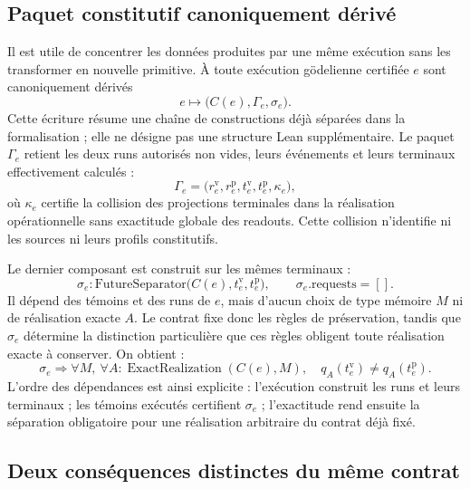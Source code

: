 \documentclass[11pt,a4paper]{article}
\newcommand{\ExactRealization}{\operatorname{ExactRealization}}
\theoremstyle{remark}
\begin{document}
\subsection{Paquet constitutif canoniquement dérivé}

Il est utile de concentrer les données produites par une même exécution
sans les transformer en nouvelle primitive. À toute exécution gödelienne
certifiée $e$ sont canoniquement dérivés
\begin{equation}\label{eq:constitutive-package}
e\longmapsto\bigl(C(e),\Gamma_e,\sigma_e\bigr).
\end{equation}
Cette écriture résume une chaîne de constructions déjà séparées dans la
formalisation ; elle ne désigne pas une structure Lean supplémentaire.
Le paquet $\Gamma_e$ retient les deux runs autorisés non vides, leurs
événements et leurs terminaux effectivement calculés :
\[
\Gamma_e=
\bigl(r_e^{\mathrm v},r_e^{\mathrm p},
      t_e^{\mathrm v},t_e^{\mathrm p},\kappa_e\bigr),
\]
où $\kappa_e$ certifie la collision des projections terminales dans la
réalisation opérationnelle sans exactitude globale des readouts. Cette
collision n'identifie ni les sources ni leurs profils constitutifs.

Le dernier composant est construit sur les mêmes terminaux :
\begin{equation}\label{eq:sigma-package}
\sigma_e:
\mathrm{FutureSeparator}
  \bigl(C(e),t_e^{\mathrm v},t_e^{\mathrm p}\bigr),
\qquad \sigma_e.\mathrm{requests}=[].
\end{equation}
Il dépend des témoins et des runs de $e$, mais d'aucun choix de type mémoire
$M$ ni de réalisation exacte $A$. Le contrat fixe donc les règles de
préservation, tandis que $\sigma_e$ détermine la distinction particulière
que ces règles obligent toute réalisation exacte à conserver. On obtient :
\begin{equation}\label{eq:package-obligation}
\boxed{
\sigma_e\Longrightarrow
\forall M,\ \forall A:\ExactRealization(C(e),M),\quad
q_A(t_e^{\mathrm v})\neq q_A(t_e^{\mathrm p}).}
\end{equation}
L'ordre des dépendances est ainsi explicite : l'exécution construit les
runs et leurs terminaux ; les témoins exécutés certifient $\sigma_e$ ;
l'exactitude rend ensuite la séparation obligatoire pour une réalisation
arbitraire du contrat déjà fixé.

\subsection{Deux conséquences distinctes du même contrat}
\end{document}
